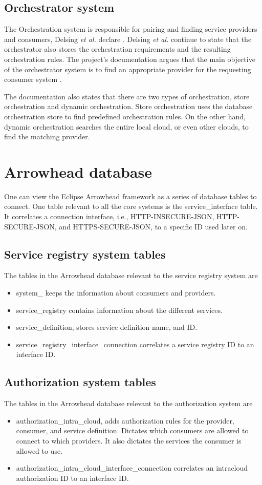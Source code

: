 \subsection{Orchestrator system}
The Orchestration system is responsible for pairing and finding service providers and consumers, Delsing \textit{et al.} declare\cite{Delsing2017} .
Delsing \textit{et al.} continue to state that the orchestrator also stores the orchestration requirements and the resulting orchestration rules.
The project's documentation argues that the main objective of the orchestrator system is to find an appropriate provider for the requesting consumer system\cite{Delsing2017} .

The documentation also states that there are two types of orchestration, store orchestration and dynamic orchestration.
Store orchestration uses the database orchestration store to find predefined orchestration rules.
On the other hand, dynamic orchestration searches the entire local cloud, or even other clouds, to find the matching provider.\cite{Github2021}
\section{Arrowhead database}
One can view the Eclipse Arrowhead framework as a series of database tables to connect.
One table relevant to all the core systems is the service\_interface table.
It correlates a connection interface, i.e., HTTP-INSECURE-JSON, HTTP-SECURE-JSON, and HTTPS-SECURE-JSON, to a specific ID used later on.
\subsection{Service registry system tables}
The tables in the Arrowhead database relevant to the service registry system are
\begin{itemize}
    \item system\_ keeps the information about consumers and providers. 
    \item service\_registry contains information about the different services.
    \item service\_definition, stores service definition name, and ID.
    \item service\_registry\_interface\_connection correlates a service registry ID to an interface ID.
\end{itemize}
\subsection{Authorization system tables}
The tables in the Arrowhead database relevant to the authorization system are
\begin{itemize}
    \item authorization\_intra\_cloud,  adds authorization rules for the provider, consumer, and service definition. Dictates which consumers are allowed to connect to which providers.  It also dictates the services the consumer is allowed to use.
    \item authorization\_intra\_cloud\_interface\_connection correlates an intracloud authorization ID to an interface ID.
\end{itemize}

